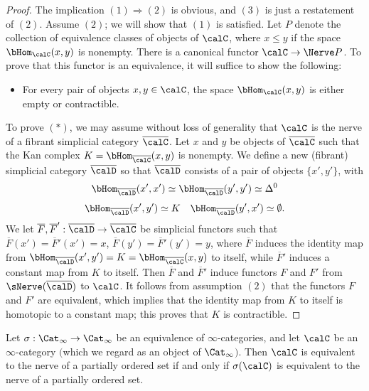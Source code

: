 \begin{proof}
The implication $(1) \Rightarrow (2)$ is obvious, and $(3)$ is just a restatement of $(2)$.
Assume $(2)$; we will show that $(1)$ is satisfied. Let $P$ denote the collection of equivalence
classes of objects of $\calC$, where $x \leq y$ if the space $\bHom_{\calC}(x,y)$ is nonempty. 
There is a canonical functor $\calC \rightarrow \Nerve P$. To prove that this functor is an equivalence, it will suffice to show the following:
\begin{itemize}
\item[$(\ast)$] For every pair of objects $x,y \in \calC$, the space $\bHom_{\calC}(x,y)$ is either empty or contractible.
\end{itemize}
To prove $(\ast)$, we may assume without loss of generality that $\calC$ is the nerve of a fibrant
simplicial category $\overline{\calC}$. Let $x$ and $y$ be objects of $\overline{\calC}$ such that
the Kan complex $K = \bHom_{ \overline{\calC} }(x,y)$ is nonempty.
We define a new (fibrant) simplicial category $\overline{\calD}$ so that $\overline{\calD}$ consists of a pair of objects $\{x', y'\}$, with
$$ \bHom_{\overline{\calD}}(x',x') \simeq \bHom_{\overline{\calD}}(y',y') \simeq \Delta^0$$
$$ \bHom_{\overline{\calD}}(x',y') \simeq K \quad \bHom_{\overline{\calD}}(y',x') \simeq \emptyset.$$
We let $\overline{F}, \overline{F}': \overline{\calD} \rightarrow \overline{\calC}$ be simplicial functors
such that $\overline{F}(x') = \overline{F}'(x') = x$, $\overline{F}(y') = \overline{F}'(y')=y$, where
$\overline{F}$ induces the identity map from $\bHom_{\overline{\calD}}(x',y') = K = \bHom_{\overline{\calC}}(x,y)$ to itself, while $\overline{F}'$ induces a constant map from $K$ to itself.
Then $\overline{F}$ and $\overline{F}'$ induce functors $F$ and $F'$ from $\sNerve( \overline{\calD} )$ to $\calC$. It follows from assumption $(2)$ that the functors $F$ and $F'$ are equivalent, which implies that the identity map from $K$ to itself is homotopic to a constant map; this proves that $K$ is contractible. 
\end{proof}

\begin{corollary}\label{bigegg}
Let $\sigma: \Cat_{\infty} \rightarrow \Cat_{\infty}$ be an equivalence of $\infty$-categories, and let
$\calC$ be an $\infty$-category $($which we regard as an object of $\Cat_{\infty}${}$)$. Then $\calC$ is equivalent to the nerve of a partially ordered set if and only if $\sigma(\calC)$ is equivalent to the nerve of a partially ordered set.
\end{corollary}

